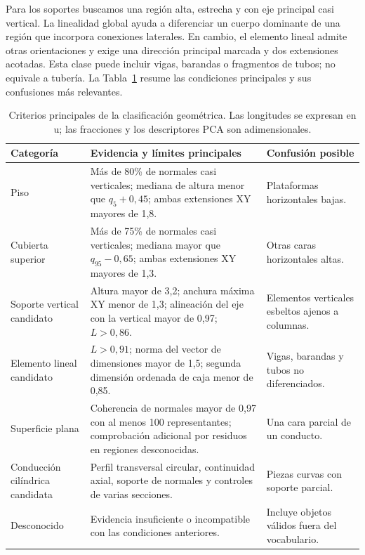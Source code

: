 \documentclass[journal,onecolumn]{IEEEtran}
\begin{document}
Para los soportes buscamos una región alta, estrecha y con eje principal casi vertical. La linealidad global ayuda a diferenciar un cuerpo dominante de una región que incorpora conexiones laterales. En cambio, el elemento lineal admite otras orientaciones y exige una dirección principal marcada y dos extensiones acotadas. Esta clase puede incluir vigas, barandas o fragmentos de tubos; no equivale a tubería. La Tabla~\ref{tab:reglas} resume las condiciones principales y sus confusiones más relevantes.
\begin{table}[H]
\centering\caption{Criterios principales de la clasificación geométrica. Las longitudes se expresan en u; las fracciones y los descriptores PCA son adimensionales.}\label{tab:reglas}
\small
\begin{tabularx}{\linewidth}{p{.19\linewidth}X p{.23\linewidth}}\toprule
Categoría & Evidencia y límites principales & Confusión posible\\\midrule
Piso & Más de 80\% de normales casi verticales; mediana de altura menor que $q_5+0,45$; ambas extensiones XY mayores de 1,8. & Plataformas horizontales bajas.\\
Cubierta superior & Más de 75\% de normales casi verticales; mediana mayor que $q_{95}-0,65$; ambas extensiones XY mayores de 1,3. & Otras caras horizontales altas.\\
Soporte vertical candidato & Altura mayor de 3,2; anchura máxima XY menor de 1,3; alineación del eje con la vertical mayor de 0,97; $L>0,86$. & Elementos verticales esbeltos ajenos a columnas.\\
Elemento lineal candidato & $L>0,91$; norma del vector de dimensiones mayor de 1,5; segunda dimensión ordenada de caja menor de 0,85. & Vigas, barandas y tubos no diferenciados.\\
Superficie plana & Coherencia de normales mayor de 0,97 con al menos 100 representantes; comprobación adicional por residuos en regiones desconocidas. & Una cara parcial de un conducto.\\
Conducción cilíndrica candidata & Perfil transversal circular, continuidad axial, soporte de normales y controles de varias secciones. & Piezas curvas con soporte parcial.\\
Desconocido & Evidencia insuficiente o incompatible con las condiciones anteriores. & Incluye objetos válidos fuera del vocabulario.\\\bottomrule
\end{tabularx}
\end{table}
\end{document}
